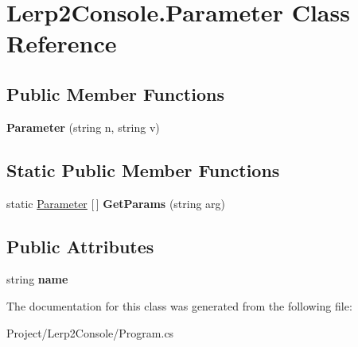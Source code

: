 \hypertarget{class_lerp2_console_1_1_parameter}{}\section{Lerp2\+Console.\+Parameter Class Reference}
\label{class_lerp2_console_1_1_parameter}
\subsection*{Public Member Functions}
\begin{DoxyCompactItemize}
\item 
\mbox{\label{class_lerp2_console_1_1_parameter_a717d6b11036cfb69f1239fb5083b913b}} 
{\bfseries Parameter} (string n, string v)
\end{DoxyCompactItemize}
\subsection*{Static Public Member Functions}
\begin{DoxyCompactItemize}
\item 
\mbox{\label{class_lerp2_console_1_1_parameter_adade34f76292514e0626d9a37377c4fa}} 
static \hyperlink{class_lerp2_console_1_1_parameter}{Parameter} \mbox{[}$\,$\mbox{]} {\bfseries Get\+Params} (string arg)
\end{DoxyCompactItemize}
\subsection*{Public Attributes}
\begin{DoxyCompactItemize}
\item 
\mbox{\label{class_lerp2_console_1_1_parameter_afb2fa9ee72b36aebb4866357b9efbfed}} 
string {\bfseries name}
\end{DoxyCompactItemize}


The documentation for this class was generated from the following file\+:\begin{DoxyCompactItemize}
\item 
Project/\+Lerp2\+Console/Program.\+cs\end{DoxyCompactItemize}
